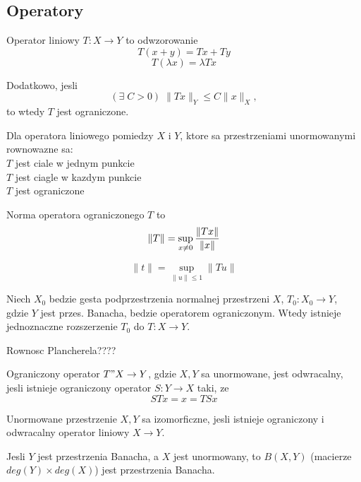 \medskip


\subsection{Operatory}

\begin{multicols}{2}



    \pdef

        {\color{def}Operator liniowy} $T:X\to Y$ to odwzorowanie
        $$T(x+y) = Tx + Ty$$
        $$T(\lambda x)=\lambda Tx$$

        Dodatkowo, jesli
        $$(\exists\;C>0)\;\|Tx\|_Y\leq C\|x\|_X,$$
        to wtedy $T$ jest {\color{def}ograniczone}.\\

    \kdef
    \bigskip

    Dla operatora liniowego pomiedzy $X$ i $Y$, ktore sa przestrzeniami unormowanymi {\color{acc}rownowazne} sa:\smallskip\\
        \point $T$ jest ciale w jednym punkcie\\
        \point $T$ jest ciagle w kazdym punkcie\\
        \point $T$ jest ograniczone
    \bigskip

    {\color{def}Norma operatora} ograniczonego $T$ to 
    $$\| T\|=\sup\limits_{x\neq0}{\|Tx\|\over\|x\|}$$

    \pdef

        $$\|t\|=\sup\limits_{\|u\|\leq 1}\|Tu\|$$

    \kdef
    \medskip

    \medskip

    Niech $X_0$ bedzie gesta podprzestrzenia normalnej przestrzeni $X$, $T_0:X_0\to Y$, gdzie $Y$ jest przes. Banacha, bedzie operatorem ograniczonym. Wtedy istnieje jednoznaczne rozszerzenie $T_0$ do $T:X\to Y$.
    \medskip

    {\color{def}Rownosc Plancherela}{\color{cyan}????}
    \medskip

    Ograniczony operator $T"X\to Y$, gdzie $X,Y$ sa unormowane, jest {\color{def}odwracalny}, jesli istnieje ograniczony operator $S:Y\to X$ taki, ze
    $$STx=x=TSx$$

    Unormowane przestrzenie $X,Y$ sa {\color{def}izomorficzne}, jesli istnieje ograniczony i odwracalny operator liniowy $X\to Y$.
    \medskip

    Jesli $Y$ jest przestrzenia Banacha, a $X$ jest unormowany, to $B(X, Y)$ (macierze $deg(Y)\times deg(X)$) jest przestrzenia Banacha.

\end{multicols}
